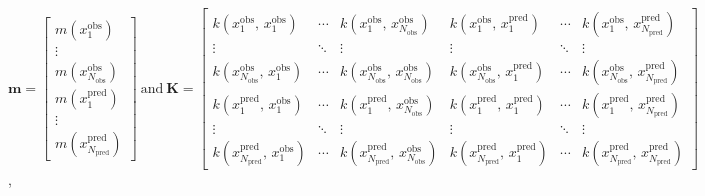 \documentclass[a4paper, 10pt]{article}
\begin{document}
\begin{flushleft}
   \vspace{1em}

   $\mathbf{m} = 
   \begin{bmatrix}
      m(x_{1}^{\text{obs}}) \\
      \vdots \\
      m(x_{N_{\text{obs}}}^{\text{obs}}) \\
      m(x_{1}^{\text{pred}}) \\
      \vdots \\
      m(x_{N_{\text{pred}}}^{\text{pred}})
   \end{bmatrix}  
   \: 
   \text{and}
   \:
   \mathbf{K} = 
   \begin{bmatrix}
      k(x_{1}^{\text{obs}}, \, x_{1}^{\text{obs}}) 
      & \cdots 
      & k(x_{1}^{\text{obs}}, \, x_{N_{\text{obs}}}^{\text{obs}}) 
      & k(x_{1}^{\text{obs}}, \, x_{1}^{\text{pred}}) 
      & \cdots 
      & k(x_{1}^{\text{obs}}, \, x_{N_{\text{pred}}}^{\text{pred}}) \\
      
      \vdots & \ddots & \vdots & \vdots & \ddots & \vdots \\
      
      k(x_{N_{\text{obs}}}^{\text{obs}}, \, x_{1}^{\text{obs}}) 
      & \cdots 
      & k(x_{N_{\text{obs}}}^{\text{obs}}, \, x_{N_{\text{obs}}}^{\text{obs}}) 
      & k(x_{N_{\text{obs}}}^{\text{obs}}, \, x_{1}^{\text{pred}}) 
      & \cdots 
      & k(x_{N_{\text{obs}}}^{\text{obs}}, \, x_{N_{\text{pred}}}^{\text{pred}}) \\
      
      k(x_{1}^{\text{pred}}, \, x_{1}^{\text{obs}}) 
      & \cdots 
      & k(x_{1}^{\text{pred}}, \, x_{N_{\text{obs}}}^{\text{obs}}) 
      & k(x_{1}^{\text{pred}}, \, x_{1}^{\text{pred}}) 
      & \cdots 
      & k(x_{1}^{\text{pred}}, \, x_{N_{\text{pred}}}^{\text{pred}}) \\
      
      \vdots & \ddots & \vdots & \vdots & \ddots & \vdots \\
      
      k(x_{N_{\text{pred}}}^{\text{pred}}, \, x_{1}^{\text{obs}}) 
      & \cdots 
      & k(x_{N_{\text{pred}}}^{\text{pred}}, \, x_{N_{\text{obs}}}^{\text{obs}}) 
      & k(x_{N_{\text{pred}}}^{\text{pred}}, \, x_{1}^{\text{pred}}) 
      & \cdots 
      & k(x_{N_{\text{pred}}}^{\text{pred}}, \, x_{N_{\text{pred}}}^{\text{pred}})
   \end{bmatrix}$,

   \vspace{1em}
   

\end{flushleft}
\end{document}
